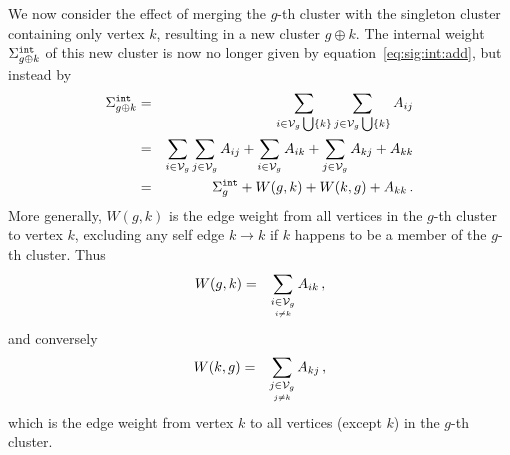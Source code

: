 \documentclass[a4paper]{article}
\begin{document}
We now consider the effect of merging the $g$-th cluster with the singleton cluster containing only vertex $k$, resulting
in a new cluster $g\oplus k$.
The internal weight $\Sigma^{\tt int}_{g\oplus k}$ of this new cluster is now
no longer given by equation~\eqref{eq:sig:int:add}, but instead by
\begin{eqnarray}
   \Sigma_{g\oplus k}^{\tt int} & = & \sum_{i\in{\cal V}_g\bigcup\{k\}}
   \sum_{j\in{\cal V}_g\bigcup\{k\}} A_{ij}
\nonumber\\&=&
    \sum_{i\in{\cal V}_g}\sum_{j\in{\cal V}_g} A_{ij}
    +\sum_{i\in{\cal V}_g}A_{ik}+\sum_{j\in{\cal V}_g}A_{kj}+A_{kk}
\nonumber\\&=&
    \Sigma_g^{\tt int}+W(g,k)+W(k,g)+A_{kk}\,.
\end{eqnarray}
More generally, $W(g,k)$ is the edge weight from all vertices in the $g$-th cluster to vertex $k$, excluding any self edge
$k\rightarrow k$ if $k$ happens to be a member of the $g$-th cluster.  Thus
\begin{eqnarray}
  W(g,k) & = & \sum_{\underset{i\ne k}{i\in{\cal V}_g}}A_{ik}\,,
\label{eq:W:g:k}
\end{eqnarray}
and conversely
\begin{eqnarray}
  W(k,g) & = & \sum_{\underset{j\ne k}{j\in{\cal V}_g}}A_{kj}\,,
\label{eq:W:k:g}
\end{eqnarray}
which is the edge weight from vertex $k$ to all vertices (except $k$) in the $g$-th cluster.
\end{document}
